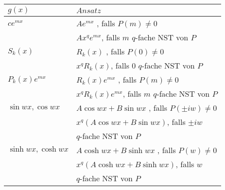 	
	
	\begin{tabular}{l|l}
		$g(x)$ & $Ansatz$ \\ \hline \hline
		$ c e^{mx} $  & $A e^{mx}$ , falls $P(m) \neq 0$\\
		&  $A x^q e^{mx}$, falls $m$ $q$-fache NST von $P$ \\ \hline
		$ S_k(x) $  & $R_k(x)$ , falls $P(0) \neq 0$\\
		&  $x^q R_k(x)$, falls $0$ $q$-fache NST von $P$ \\ \hline
		$ P_k(x) e^{mx} $  & $R_k(x) e^{mx}$ , falls $P(m) \neq 0$\\
		&  $x^q R_k(x) e^{mx}$, falls $m$ $q$-fache NST von $P$ \\ \hline
		$ \sin wx, \cos wx $  & $A \cos wx + B \sin wx$ , falls $P(\pm iw) \neq 0$\\
		&  $x^q (A \cos wx + B \sin wx)$, falls $\pm iw$ \\
		& $q$-fache NST von $P$ \\ \hline
		$ \sinh wx, \cosh wx $  & $A \cosh wx + B \sinh wx$ , falls $P(w) \neq 0$\\
		&  $x^q (A \cosh wx + B \sinh wx)$, falls $w$ \\
		& $q$-fache NST von $P$ \\
	\end{tabular}
